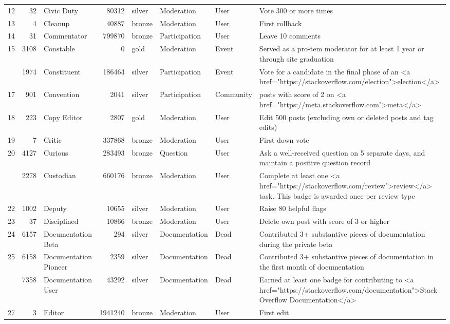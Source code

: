 \documentclass[]{book}
\theoremstyle{definition}
\theoremstyle{definition}
\theoremstyle{definition}
\theoremstyle{remark}
\begin{document}
\begin{landscape}
\begin{longtable}[t]{lr>{\raggedright\arraybackslash}p{2cm}rlll>{\raggedright\arraybackslash}p{10cm}}
12 & 32 & Civic Duty & 80312 & silver & Moderation & User & Vote 300 or more times\\
13 & 4 & Cleanup & 40887 & bronze & Moderation & User & First rollback\\
14 & 31 & Commentator & 799870 & bronze & Participation & User & Leave 10 comments\\
15 & 3108 & Constable & 0 & gold & Moderation & Event & Served as a pro-tem moderator for at least 1 year or through site graduation\\
\addlinespace
16 & 1974 & Constituent & 186464 & silver & Participation & Event & Vote for a candidate in the final phase of an <a href="https://stackoverflow.com/election">election</a>\\
17 & 901 & Convention & 2041 & silver & Participation & Community & 10 posts with score of 2 on <a href="https://meta.stackoverflow.com">meta</a>\\
18 & 223 & Copy Editor & 2807 & gold & Moderation & User & Edit 500 posts (excluding own or deleted posts and tag edits)\\
19 & 7 & Critic & 337868 & bronze & Moderation & User & First down vote\\
20 & 4127 & Curious & 283493 & bronze & Question & User & Ask a well-received question on 5 separate days, and maintain a positive question record\\
\addlinespace
21 & 2278 & Custodian & 660176 & bronze & Moderation & User & Complete at least one <a href="https://stackoverflow.com/review">review</a> task. This badge is awarded once per review type\\
22 & 1002 & Deputy & 10655 & silver & Moderation & User & Raise 80 helpful flags\\
23 & 37 & Disciplined & 10866 & bronze & Moderation & User & Delete own post with score of 3 or higher\\
24 & 6157 & Documentation Beta & 294 & silver & Documentation & Dead & Contributed 3+ substantive pieces of documentation during the private beta\\
25 & 6158 & Documentation Pioneer & 2359 & silver & Documentation & Dead & Contributed 3+ substantive pieces of documentation in the first month of documentation\\
\addlinespace
26 & 7358 & Documentation User & 43292 & silver & Documentation & Dead & Earned at least one badge for contributing to <a href="https://stackoverflow.com/documentation">Stack Overflow Documentation</a>\\
27 & 3 & Editor & 1941240 & bronze & Moderation & User & First edit\\

\end{longtable}
\end{landscape}
\end{document}
